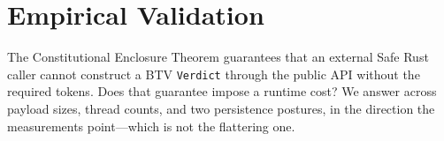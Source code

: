 %
%
%

\section{Empirical Validation}
\label{sec:benchmarks}

The Constitutional Enclosure Theorem guarantees that an external Safe Rust
caller cannot construct a BTV \texttt{Verdict} through the public API without
the required tokens.  Does that guarantee impose a runtime cost?  We answer
across payload sizes, thread counts, and two persistence postures, in the
direction the measurements point---which is not the flattering one.

